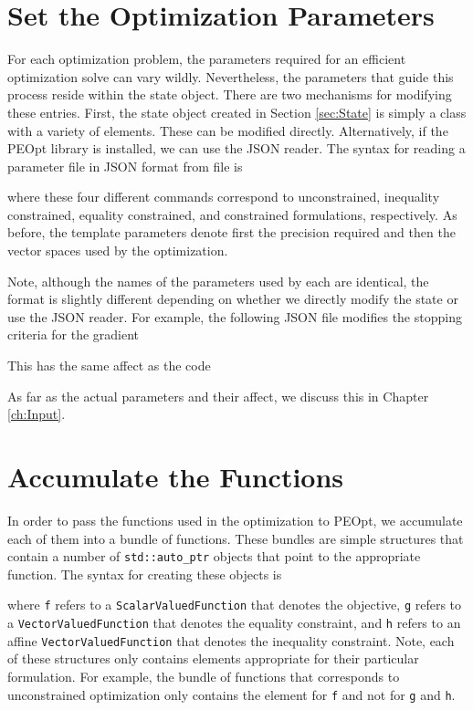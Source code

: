 \documentclass{report}
\begin{document}
\section{Set the Optimization Parameters}

        For each optimization problem, the parameters required for an efficient optimization solve can vary wildly.  Nevertheless, the parameters that guide this process reside within the state object.  There are two mechanisms for modifying these entries.  First, the state object created in Section \ref{sec:State} is simply a class with a variety of elements.  These can be modified directly.  Alternatively, if the PEOpt library is installed, we can use the JSON reader.  The syntax for reading a parameter file in JSON format from file is

where these four different commands correspond to unconstrained, inequality constrained, equality constrained, and constrained formulations, respectively.  As before, the template parameters denote first the precision required and then the vector spaces used by the optimization.

        Note, although the names of the parameters used by each are identical, the format is slightly different depending on whether we directly modify the state or use the JSON reader.  For example, the following JSON file modifies the stopping criteria for the gradient

This has the same affect as the code


        As far as the actual parameters and their affect, we discuss this in Chapter \ref{ch:Input}.

\section{Accumulate the Functions}

        In order to pass the functions used in the optimization to PEOpt, we accumulate each of them into a bundle of functions.  These bundles are simple structures that contain a number of \texttt{std::auto\_ptr} objects that point to the appropriate function.  The syntax for creating these objects is

where \texttt{f} refers to a \texttt{ScalarValuedFunction} that denotes the objective, \texttt{g} refers to a \texttt{VectorValuedFunction} that denotes the equality constraint, and \texttt{h} refers to an affine \texttt{VectorValuedFunction} that denotes the inequality constraint.  Note, each of these structures only contains elements appropriate for their particular formulation.  For example, the bundle of functions that corresponds to unconstrained optimization only contains the element for \texttt{f} and not for \texttt{g} and \texttt{h}.
\end{document}
